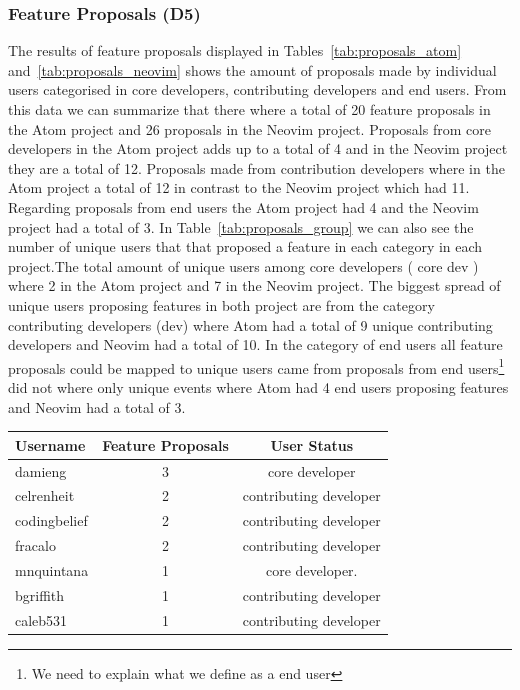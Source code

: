 \documentclass[a4paper,11pt]{article}
\begin{document}
{\subsubsection{Feature Proposals (D5)}
The results of feature proposals displayed in Tables~\ref{tab:proposals_atom} and~\ref{tab:proposals_neovim} shows the amount of proposals made by individual users categorised in core developers, contributing developers and end users. From this data we can summarize that there where a total of 20 feature proposals in the Atom project and 26 proposals in the Neovim project. Proposals from core developers in the Atom project adds up to a total of 4 and in the Neovim project they are a total of 12. Proposals made from contribution developers where in the Atom project a total of 12 in contrast to the Neovim project which had 11. Regarding proposals from end users the Atom project had 4 and the Neovim project had a total of 3.
In Table~\ref{tab:proposals_group} we can also see the number of unique users that that proposed a feature in each category in each project.The total amount of unique users among core developers ( core dev ) where 2 in the Atom project and  7 in the Neovim project. The biggest spread of unique users proposing features in both project are from the category contributing developers (dev) where Atom had a total of 9 unique contributing developers and Neovim had a total of 10. In the category of end users all feature proposals could be mapped to unique users came from  proposals from end users\footnote{We need to explain what we define as a end user} did not where only unique events where Atom had 4 end users proposing features and Neovim had a total of 3.
\begin{table}[h]
	\centering
	\begin{tabular}{ | l | c | c |}
		\hline
		\textbf{Username} 	& \textbf{Feature Proposals}	& \textbf{User Status}	\\\hline
		damieng	 		& 3		 				& core developer		\\\hline
		celrenheit	 		& 2		 				& contributing developer	\\\hline
		codingbelief	 	& 2		 				& contributing developer	\\\hline
		fracalo	 		& 2		 				& contributing developer	\\\hline
		mnquintana	 	& 1		 				& core developer. 		\\\hline
		bgriffith	 		& 1		 				& contributing developer	\\\hline
		caleb531	 		& 1		 				& contributing developer	\\\hline

\end{tabular}
\end{table}}
\end{document}
